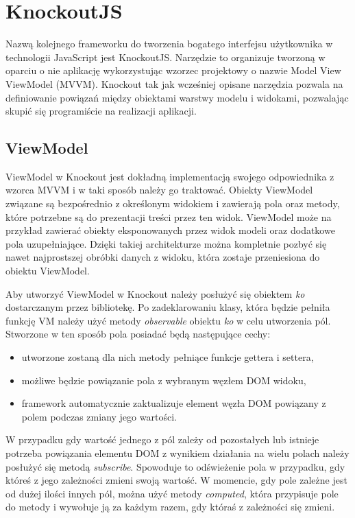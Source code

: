 \section{KnockoutJS}
Nazwą kolejnego frameworku do tworzenia bogatego interfejsu użytkownika w technologii JavaScript jest KnockoutJS. Narzędzie to organizuje tworzoną w oparciu o nie aplikację wykorzystując wzorzec projektowy o nazwie Model View ViewModel (MVVM)\cite{knockoutjs}. Knockout tak jak wcześniej opisane narzędzia pozwala na definiowanie powiązań między obiektami warstwy modelu i widokami, pozwalając skupić się programiście na realizacji aplikacji.


\subsection{ViewModel}
ViewModel w Knockout jest dokładną implementacją swojego odpowiednika z wzorca MVVM i w taki sposób należy go traktować. Obiekty ViewModel związane są bezpośrednio z określonym widokiem i zawierają pola oraz metody, które potrzebne są do prezentacji treści przez ten widok. ViewModel może na przykład zawierać obiekty eksponowanych przez widok modeli oraz dodatkowe pola uzupełniające. Dzięki takiej architekturze można kompletnie pozbyć się nawet najprostszej obróbki danych z widoku, która zostaje przeniesiona do obiektu ViewModel.

Aby utworzyć ViewModel w Knockout należy posłużyć się obiektem \textit{ko} dostarczanym przez bibliotekę. Po zadeklarowaniu klasy, która będzie pełniła funkcję VM należy użyć metody \textit{observable} obiektu \textit{ko} w celu utworzenia pól. Stworzone w ten sposób pola posiadać będą następujące cechy:
\begin{itemize}
\item utworzone zostaną dla nich metody pełniące funkcje gettera i settera,
\item możliwe będzie powiązanie pola z wybranym węzłem DOM widoku,
\item framework automatycznie zaktualizuje element węzła DOM powiązany z polem podczas zmiany jego wartości.
\end{itemize}

W przypadku gdy wartość jednego z pól zależy od pozostałych lub istnieje potrzeba powiązania elementu DOM z wynikiem działania na wielu polach należy posłużyć się metodą \textit{subscribe}.
Spowoduje to odświeżenie pola w przypadku, gdy któreś z jego zależności zmieni swoją wartość. W momencie, gdy pole zależne jest od dużej ilości innych pól, można użyć metody \textit{computed}, która przypisuje pole do metody i wywołuje ją za każdym razem, gdy któraś z zależności się zmieni.

